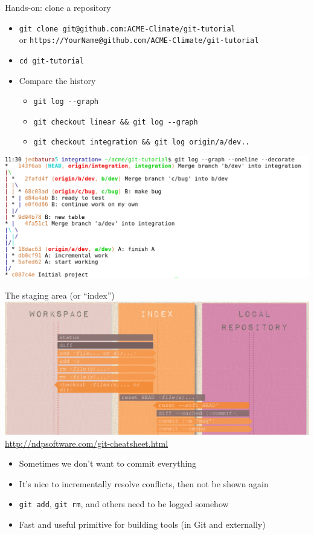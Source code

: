 \documentclass{beamer}
\begin{document}
\begin{frame}{Hands-on: clone a repository}
  \begin{itemize}
  \item \texttt{git clone git@github.com:ACME-Climate/git-tutorial} \\
    {\small or \texttt{https://YourName@github.com/ACME-Climate/git-tutorial}}
  \item \texttt{cd git-tutorial}
  \item Compare the history
    \begin{itemize}
    \item \texttt{git log -{}-graph}
    \item \texttt{git checkout linear \&\& git log -{}-graph}
    \item \texttt{git checkout integration \&\& git log origin/a/dev..}
    \end{itemize}
  \end{itemize}
  \includegraphics[width=\textwidth]{figures/Git/log-graph-integration.png} \\
\end{frame}

\begin{frame}{The staging area (or ``index'')}
  \includegraphics[width=\textwidth]{figures/Git/staging-area.png} \\
  {\tiny \url{http://ndpsoftware.com/git-cheatsheet.html}}
  \begin{itemize}
  \item Sometimes we don't want to commit everything
  \item It's nice to incrementally resolve conflicts, then not be shown again
  \item \texttt{git add}, \texttt{git rm}, and others need to be logged somehow
  \item Fast and useful primitive for building tools (in Git and externally)
  \end{itemize}
\end{frame}
\end{document}
